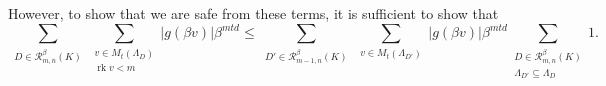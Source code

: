 \documentclass{amsart}
\newcommand{\OK}{\mathcal{O}_K}
\DeclareMathOperator{\rank}{rk}
\begin{document}
 However, to show that we are safe from these terms, it is sufficient to show that 
 \begin{equation}
 \label{eq:terms_impossible_otherwise}
 \sum_{\substack{D \in \mathcal{R}_{m,n}^{\beta}(K) }}
 \sum_{\substack{v  \in  M_t(\Lambda_{D}) \\ \rank v < m}} \left|g(\beta v)\right| \beta^{mtd} 
 \leq
 \sum_{\substack{D' \in \mathcal{R}^{\beta}_{m-1,n}(K) }}
 \sum_{\substack{v \in M_t(\Lambda_{D'}) }} \left|g(\beta v)\right| \beta^{mtd} 
 \sum_{\substack{D \in \mathcal{R}_{m,n}^{\beta}(K)    \\ \Lambda_{D'} \subseteq \Lambda_D }} 1 .
 \end{equation}



\end{document}
